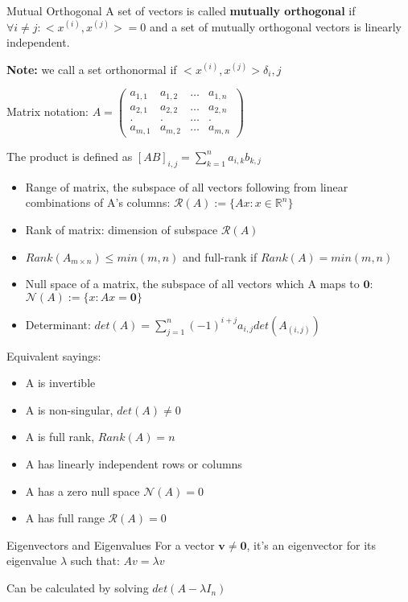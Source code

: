 \documentclass[a4paper]{article}
\begin{document}
\begin{mainbox}{Mutual Orthogonal}
    A set of vectors is called \textbf{mutually orthogonal} if $\forall i \neq j : <x^{(i)}, x^{(j)}> = 0$ and a set of mutually orthogonal vectors is linearly independent.
\end{mainbox}
\textbf{Note:} we call a set orthonormal if $<x^{(i)}, x^{(j)}> \delta_i,j$  

Matrix notation:
$A= \left( \begin{smallmatrix} a_{1,1} & a_{1,2} & \dots & a_{1,n} \\
a_{2,1} & a_{2,2} & \dots & a_{2,n} \\
. & . & \dots & .\\
a_{m,1} & a_{m,2} & \dots & a_{m,n} \end{smallmatrix} \right)$ 

The product is defined as $\left[AB\right]_{i,j} = \sum_{k=1}^{n} a_{i,k}b_{k,j}$ 

\begin{itemize}
    \item Range of matrix, the subspace of all vectors following from linear combinations of A's columns: $\mathcal{R}(A) := \{Ax : x\in\mathbb{R}^n \}$
    \item Rank of matrix: dimension of subspace $\mathcal{R}(A)$
    \item $Rank(A_{m\times n}) \leq min(m,n)$ and full-rank if $Rank(A) = min(m,n)$
    \item Null space of a matrix, the subspace of all vectors which A maps to $\mathbf{0}$: $\mathcal{N}(A) := \{x: Ax =\mathbf{0}\}$
    \item Determinant: $det(A) = \sum_{j=1}^{n} (-1)^{i+j}a_{i,j}det(A_{(i,j)})$     
\end{itemize}

Equivalent sayings:
\begin{itemize}
    \item A is invertible
    \item A is non-singular, $det(A) \neq 0$ 
    \item A is full rank, $Rank(A) = n$
    \item A has linearly independent rows or columns
    \item A has a zero null space $\mathcal{N}(A) = 0$
    \item A has full range $\mathcal{R}(A) = 0$   
\end{itemize}

\begin{subbox}{Eigenvectors and Eigenvalues}
    For a vector $\mathbf{v} \neq \mathbf{0}$, it's an eigenvector for its eigenvalue $\lambda$ such that: $Av = \lambda v$    
    
\end{subbox}
Can be calculated by solving $det(A - \lambda I_n)$  
\end{document}
